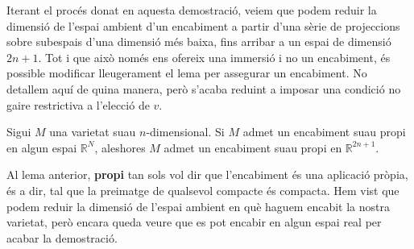 Iterant el procés donat en aquesta demostració, veiem que podem reduir la dimensió de l'espai ambient d'un encabiment a partir d'una sèrie de projeccions sobre subespais d'una dimensió més baixa, fins arribar a un espai de dimensió $2n+1$. Tot i que això només ens ofereix una immersió i no un encabiment, és possible modificar lleugerament el lema per assegurar un encabiment. No detallem aquí de quina manera, però s'acaba reduint a imposar una condició no gaire restrictiva a l'elecció de $v$.

\begin{lema}\label{lema:encabiment_whitney}
    Sigui $M$ una varietat suau $n$-dimensional. Si $M$ admet un encabiment suau propi en algun espai $\mathbb R^N$, aleshores $M$ admet un encabiment suau propi en $\mathbb R^{2n+1}$.
\end{lema}

Al lema anterior, \textbf{propi} tan sols vol dir que l'encabiment és una aplicació pròpia, és a dir, tal que la preimatge de qualsevol compacte és compacta. Hem vist que podem reduir la dimensió de l'espai ambient en què haguem encabit la nostra varietat, però encara queda veure que es pot encabir en algun espai real per acabar la demostració.

